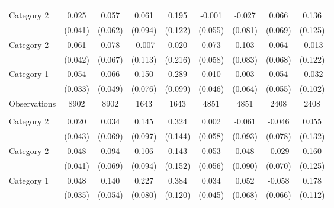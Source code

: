 {\begin{longtable}{l*{8}{c}}
\midrule
\addlinespace
\multicolumn{9}{l}{\textit{Panel B: Goods index}} \\
\addlinespace
Category 2&    0.025         &    0.057         &    0.061         &    0.195         &   -0.001         &   -0.027         &    0.066         &    0.136         \\
                &  (0.041)         &  (0.062)         &  (0.094)         &  (0.122)         &  (0.055)         &  (0.081)         &  (0.069)         &  (0.125)         \\
\addlinespace
Category 2&    0.061         &    0.078         &   -0.007         &    0.020         &    0.073         &    0.103         &    0.064         &   -0.013         \\
                &  (0.042)         &  (0.067)         &  (0.113)         &  (0.216)         &  (0.058)         &  (0.083)         &  (0.068)         &  (0.122)         \\
\addlinespace
Category 1&    0.054         &    0.066         &    0.150\sym{**} &    0.289\sym{***}&    0.010         &    0.003         &    0.054         &   -0.032         \\
                &  (0.033)         &  (0.049)         &  (0.076)         &  (0.099)         &  (0.046)         &  (0.064)         &  (0.055)         &  (0.102)         \\

\midrule
Observations    &     8902         &     8902         &     1643         &     1643         &     4851         &     4851         &     2408         &     2408         \\



\midrule
\addlinespace
\multicolumn{9}{l}{\textit{Panel C: Time index}} \\
\addlinespace
Category 2&    0.020         &    0.034         &    0.145         &    0.324\sym{**} &    0.002         &   -0.061         &   -0.046         &    0.055         \\
                &  (0.043)         &  (0.069)         &  (0.097)         &  (0.144)         &  (0.058)         &  (0.093)         &  (0.078)         &  (0.132)         \\
\addlinespace
Category 2&    0.048         &    0.094         &    0.106         &    0.143         &    0.053         &    0.048         &   -0.029         &    0.160         \\
                &  (0.041)         &  (0.069)         &  (0.094)         &  (0.152)         &  (0.056)         &  (0.090)         &  (0.070)         &  (0.125)         \\
\addlinespace
Category 1&    0.048         &    0.140\sym{**} &    0.227\sym{***}&    0.384\sym{***}&    0.034         &    0.052         &   -0.058         &    0.178         \\
                &  (0.035)         &  (0.054)         &  (0.080)         &  (0.120)         &  (0.045)         &  (0.068)         &  (0.066)         &  (0.112)         \\


\end{longtable}}
